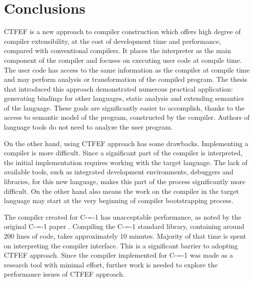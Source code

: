 \section{Conclusions}

CTFEF is a new approach to compiler construction which offers high degree of compiler extensibility, at the cost of development time and performance, compared with conventional compilers.
It places the interpreter as the main component of the compiler and focuses on executing user code at compile time.
The user code has access to the same information as the compiler at compile time and may perform analysis or transformation of the compiled program.
The thesis that introduced this approach \cite{grabski2020} demonstrated numerous practical application: generating bindings for other languages, static analysis and extending semantics of the language.
These goals are significantly easier to accomplish, thanks to the access to semantic model of the program, constructed by the compiler.
Authors of language tools do not need to analyze the user program.

On the other hand, using CTFEF approach has some drawbacks. Implementing a compiler is more difficult.
Since a significant part of the compiler is interpreted, the initial implementation requires working with the target language.
The lack of available tools, such as integrated development environments, debuggers and libraries, for this new language, makes this part of the process significantly more difficult.
On the other hand also means the work on the compiler in the target language may start at the very beginning of compiler bootstrapping process\cite{puntambekar:compiler_design, novillo2007gcc}.

The compiler created for C-=-1 has unacceptable performance, as noted by the original C-=-1 paper \cite{grabski2022compilation}.
Compiling the C-=-1 standard library, containing around 200 lines of code, takes approximately 10 minutes.
Majority of that time is spent on interpreting the compiler interface.
This is a significant barrier to adopting CTFEF approach.
Since the compiler implemented for C-=-1 was made as a research tool with minimal effort, further work is needed to explore the performance issues of CTFEF approach.
